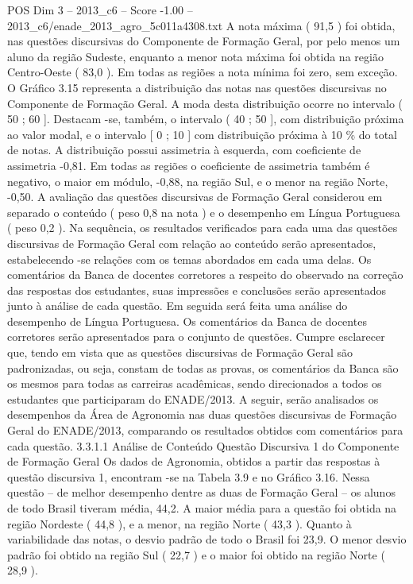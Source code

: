 \begin{textsample}{POS Dim 3 – 2013\_c6 – Score -1.00 – 2013\_c6/enade\_2013\_agro\_5c011a4308.txt}
A nota máxima ( 91,5 ) foi obtida, nas questões discursivas do Componente de Formação Geral, por pelo menos um aluno da região Sudeste, enquanto a menor nota máxima foi obtida na região Centro-Oeste ( 83,0 ).
Em todas as regiões a nota mínima foi zero, sem exceção.
O Gráfico 3.15 representa a distribuição das notas nas questões discursivas no Componente de Formação Geral.
A moda desta distribuição ocorre no intervalo ( 50 ; 60 ].
Destacam -se, também, o intervalo ( 40 ; 50 ], com distribuição próxima ao valor modal, e o intervalo [ 0 ; 10 ] com distribuição próxima à 10 \% do total de notas.
A distribuição possui assimetria à esquerda, com coeficiente de assimetria -0,81.
Em todas as regiões o coeficiente de assimetria também é negativo, o maior em módulo, -0,88, na região Sul, e o menor na região Norte, -0,50.
A avaliação das questões discursivas de Formação Geral considerou em separado o conteúdo ( peso 0,8 na nota ) e o desempenho em Língua Portuguesa ( peso 0,2 ).
Na sequência, os resultados verificados para cada uma das questões discursivas de Formação Geral com relação ao conteúdo serão apresentados, estabelecendo -se relações com os temas abordados em cada uma delas.
Os comentários da Banca de docentes corretores a respeito do observado na correção das respostas dos estudantes, suas impressões e conclusões serão apresentados junto à análise de cada questão.
Em seguida será feita uma análise do desempenho de Língua Portuguesa.
Os comentários da Banca de docentes corretores serão apresentados para o conjunto de questões.
Cumpre esclarecer que, tendo em vista que as questões discursivas de Formação Geral são padronizadas, ou seja, constam de todas as provas, os comentários da Banca são os mesmos para todas as carreiras acadêmicas, sendo direcionados a todos os estudantes que participaram do ENADE/2013.
A seguir, serão analisados os desempenhos da Área de Agronomia nas duas questões discursivas de Formação Geral do ENADE/2013, comparando os resultados obtidos com comentários para cada questão. 3.3.1.1 Análise de Conteúdo Questão Discursiva 1 do Componente de Formação Geral Os dados de Agronomia, obtidos a partir das respostas à questão discursiva 1, encontram -se na Tabela 3.9 e no Gráfico 3.16.
Nessa questão – de melhor desempenho dentre as duas de Formação Geral – os alunos de todo Brasil tiveram média, 44,2.
A maior média para a questão foi obtida na região Nordeste ( 44,8 ), e a menor, na região Norte ( 43,3 ).
Quanto à variabilidade das notas, o desvio padrão de todo o Brasil foi 23,9.
O menor desvio padrão foi obtido na região Sul ( 22,7 ) e o maior foi obtido na região Norte ( 28,9 ).

\end{textsample}
